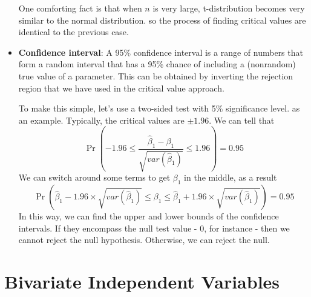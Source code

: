 \begin{itemize}
One comforting fact is that when $n$ is very large, t-distribution becomes very similar to the normal distribution. so the process of finding critical values are identical to the previous case.
\item \textbf{Confidence interval}: A 95\% confidence interval is a range of numbers that form a random interval that has a 95\% chance of including a (nonrandom) true value of a parameter. This can be obtained by inverting the rejection region that we have used in the critical value approach. \par\medskip
To make this simple, let's use a two-sided test  with 5\% significance level. as an example. Typically, the critical values are $\pm1.96$. We can tell that 
\[
\Pr\left(-1.96\leq \frac{\hat{\beta}_1-\beta_1}{\sqrt{var(\hat{\beta}_1)}} \leq1.96\right)=0.95
\]
We can switch around some terms to get $\beta_1$ in the middle, as a result
\[
\Pr\left(\hat{\beta}_1-1.96\times\sqrt{var(\hat{\beta}_1)} \leq \beta_1 \leq\hat{\beta}_1+1.96\times\sqrt{var(\hat{\beta}_1)}\right)=0.95
\]
In this way, we can find the upper and lower bounds of the confidence intervals. If they encompass the null test value - 0, for instance - then we cannot reject the null hypothesis. Otherwise, we can reject the null. 
\end{itemize}

\section{Bivariate Independent Variables}

